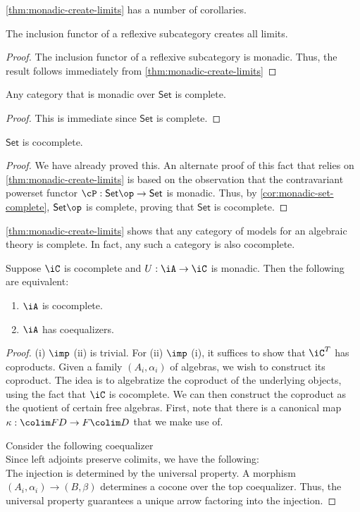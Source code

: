 \documentclass{amsart}
\begin{document}
\cref{thm:monadic-create-limits} has a number of corollaries.

\begin{cor}
  The inclusion functor of a reflexive subcategory creates all limits.
\end{cor}
\begin{proof}
  The inclusion functor of a reflexive subcategory is monadic.
  Thus, the result follows immediately from \cref{thm:monadic-create-limits}
\end{proof}

\begin{cor}\label{cor:monadic-set-complete}
  Any category that is monadic over $\mathsf{Set}$ is complete.
\end{cor}
\begin{proof}
  This is immediate since $\mathsf{Set}$ is complete.
\end{proof}

\begin{cor}
  $\mathsf{Set}$ is cocomplete.
\end{cor}
\begin{proof}
  We have already proved this.
  An alternate proof of this fact that relies on \cref{thm:monadic-create-limits} is based on the observation that the contravariant powerset functor $\cP : \mathsf{Set}\op \to \mathsf{Set}$ is monadic.
  Thus, by \cref{cor:monadic-set-complete}, $\mathsf{Set}\op$ is complete, proving that $\mathsf{Set}$ is cocomplete.
\end{proof}

\cref{thm:monadic-create-limits} shows that any category of models for an algebraic theory is complete.
In fact, any such a category is also cocomplete.

\begin{thm}
  Suppose $\iC$ is cocomplete and $U : \iA \to \iC$ is monadic.
  Then the following are equivalent:
  \begin{enumerate}
  \item $\iA$ is cocomplete.
  \item $\iA$ has coequalizers.
  \end{enumerate}
\end{thm}
\begin{proof}
  (i) $\imp$ (ii) is trivial.
  For (ii) $\imp$ (i), it suffices to show that $\iC^{T}$ has coproducts.
  Given a family $(A_{i},\alpha_{i})$ of algebras, we wish to construct its coproduct.
  The idea is to algebratize the coproduct of the underlying objects, using the fact that $\iC$ is cocomplete.
  We can then construct the coproduct as the quotient of certain free algebras.
  First, note that there is a canonical map $\kappa : \colim FD \to F\colim D$ that we make use of.

  Consider the following coequalizer
  \[\]
  Since left adjoints preserve colimits, we have the following:
  \[\]
  The injection is determined by the universal property.
  A morphism $(A_{i},\alpha_{i}) \to (B,\beta)$ determines a cocone over the top coequalizer.
  Thus, the universal property guarantees a unique arrow factoring into the injection.
\end{proof}



\end{document}
